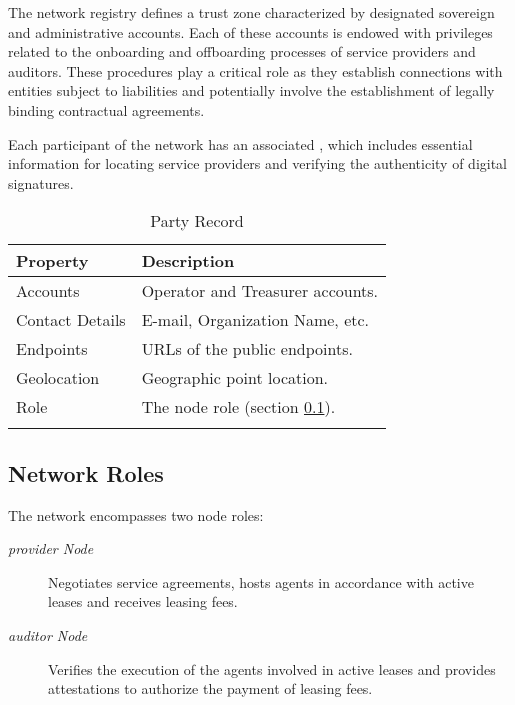 \documentclass{oc}
\begin{document}
The network registry defines a trust zone characterized by designated sovereign and administrative accounts. Each of these accounts is endowed with privileges related to the onboarding and offboarding processes of service providers and auditors.
These procedures play a critical role as they establish connections with entities subject to liabilities and potentially involve the establishment of legally binding contractual agreements.

Each participant of the network has an associated , which includes essential information for locating service providers and verifying the authenticity of digital signatures.

\begin{xltabular}{\linewidth}{ l  X }
  \caption{Party Record} 
  \label{table:party-record}\\
  \toprule
   Property & Description  \\
  \midrule
  \endfirsthead
  \endhead
  \bottomrule
  \endfoot
  
  Accounts & Operator and Treasurer accounts. \\ \addlinespace
  
  Contact Details & E-mail, Organization Name, etc. \\   \addlinespace
  
  Endpoints & URLs\cite{rfc3986} of the public endpoints. \\  \addlinespace
  
  Geolocation & Geographic point location\cite{iso6709}. \\  \addlinespace
    
  Role & The node role (section \ref{sec:network-roles}). \\ \addlinespace
  
\end{xltabular}

\subsection{Network Roles}\label{sec:network-roles}

The network encompasses two node roles:
\begin{description}
  \item[\emph{\Gls*{provider} Node}] Negotiates service agreements, hosts \glspl{agent} in accordance with active leases and receives leasing fees.
  \item[\emph{\Gls*{auditor} Node}] Verifies the execution of the \glspl{agent} involved in active leases and provides attestations to authorize the payment of leasing fees.
\end{description}
\end{document}
